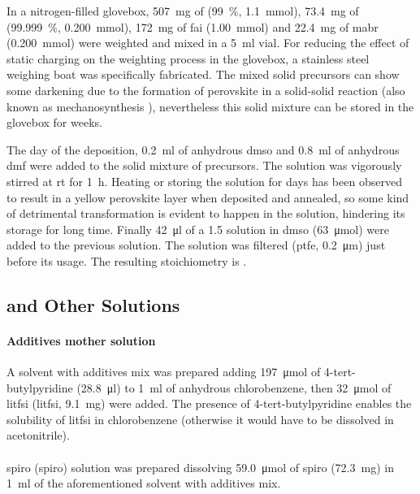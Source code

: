 		In a nitrogen-filled glovebox, \SI{507}{\mg} of  (\SI{99}{\%}, \SI{1.1}{\mmol}), \SI{73.4}{\mg} of  (\SI{99.999}{\%}, \SI{0.200}{\mmol}), \SI{172}{\mg} of \gls{fai} (\SI{1.00}{\mmol}) and \SI{22.4}{\mg} of \gls{mabr} (\SI{0.200}{\mmol}) were weighted and mixed in a \SI{5}{\ml} vial.
		For reducing the effect of static charging on the weighting process in the glovebox, a stainless steel weighing boat was specifically fabricated.
		The mixed solid precursors can show some darkening due to the formation of perovskite in a solid-solid reaction (also known as mechanosynthesis \cite{Prochowicz2018}), nevertheless this solid mixture can be stored in the glovebox for weeks.

		The day of the deposition, \SI{0.2}{\ml} of anhydrous \gls{dmso} and \SI{0.8}{\ml} of anhydrous \gls{dmf} were added to the solid mixture of precursors.
		The solution was vigorously stirred at \gls{rt} for \SI{1}{\hour}.
		Heating or storing the solution for days has been observed to result in a yellow perovskite layer when deposited and annealed, so some kind of detrimental transformation is evident to happen in the solution, hindering its storage for long time.
		Finally \SI{42}{\ul} of	a \SI{1.5}{\Molar}  solution in \gls{dmso} (\SI{63}{\umol}) were added to the previous solution.
		The solution was filtered (\gls{ptfe}, \SI{0.2}{\um}) just before its usage.
		The resulting stoichiometry is .

	\subsection{ and Other  Solutions}

		\paragraph{Additives mother solution}
		A solvent with additives mix was prepared adding \SI{197}{\umol} of 4-tert-butylpyridine (\SI{28.8}{\ul}) to \SI{1}{\ml} of anhydrous chlorobenzene, then \SI{32}{\umol} of \glsdesc{litfsi} (\gls{litfsi}, \SI{9.1}{\mg}) were added.
		The presence of 4-tert-butylpyridine enables the solubility of \gls{litfsi} in chlorobenzene (otherwise it would have to be dissolved in acetonitrile).

		\paragraph{}
		\Glsdesc{spiro} (\gls{spiro}) solution was prepared dissolving \SI{59.0}{\umol} of \gls{spiro} (\SI{72.3}{\mg}) in \SI{1}{\ml} of the aforementioned solvent with additives mix.

